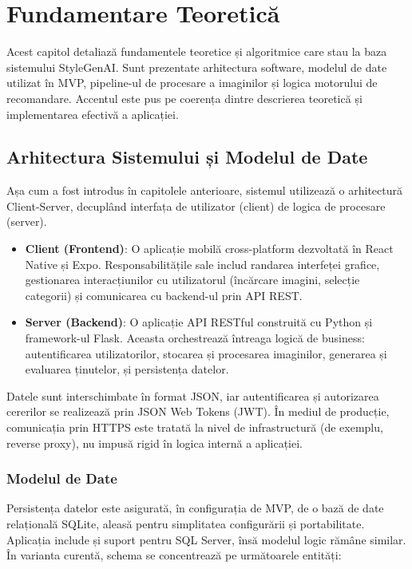 \chapter{Fundamentare Teoretică}
\label{cap:fundamentare_teoretica}

Acest capitol detaliază fundamentele teoretice și algoritmice care stau la baza sistemului StyleGenAI. Sunt prezentate arhitectura software, modelul de date utilizat în MVP, pipeline-ul de procesare a imaginilor și logica motorului de recomandare. Accentul este pus pe coerența dintre descrierea teoretică și implementarea efectivă a aplicației.

\section{Arhitectura Sistemului și Modelul de Date}
\label{sec:arhitectura_cap4}

Așa cum a fost introdus în capitolele anterioare, sistemul utilizează o arhitectură Client-Server, decuplând interfața de utilizator (client) de logica de procesare (server).

\begin{itemize}
    \item \textbf{Client (Frontend)}: O aplicație mobilă cross-platform dezvoltată în React Native și Expo. Responsabilitățile sale includ randarea interfeței grafice, gestionarea interacțiunilor cu utilizatorul (încărcare imagini, selecție categorii) și comunicarea cu backend-ul prin API REST.
    \item \textbf{Server (Backend)}: O aplicație API RESTful construită cu Python și framework-ul Flask. Aceasta orchestrează întreaga logică de business: autentificarea utilizatorilor, stocarea și procesarea imaginilor, generarea și evaluarea ținutelor, și persistența datelor.
\end{itemize}

Datele sunt interschimbate în format JSON, iar autentificarea și autorizarea cererilor se realizează prin JSON Web Tokens (JWT). În mediul de producție, comunicația prin HTTPS este tratată la nivel de infrastructură (de exemplu, reverse proxy), nu impusă rigid în logica internă a aplicației.

\subsection{Modelul de Date}
Persistența datelor este asigurată, în configurația de MVP, de o bază de date relațională SQLite, aleasă pentru simplitatea configurării și portabilitate. Aplicația include și suport pentru SQL Server, însă modelul logic rămâne similar. În varianta curentă, schema se concentrează pe următoarele entități:

